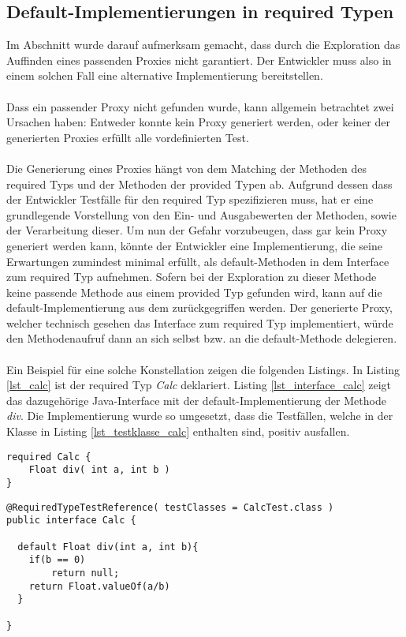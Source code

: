 \subsection{Default-Implementierungen in required Typen}
Im Abschnitt \label{sec_stability} wurde darauf aufmerksam gemacht, dass durch die Exploration das Auffinden eines passenden Proxies nicht garantiert. Der Entwickler muss also in einem solchen Fall eine alternative Implementierung bereitstellen.
\\\\
Dass ein passender Proxy nicht gefunden wurde, kann allgemein betrachtet zwei Ursachen haben: Entweder konnte kein Proxy generiert werden, oder keiner der generierten Proxies erfüllt alle vordefinierten Test. 
\\\\
Die Generierung eines Proxies hängt von dem Matching der Methoden des required Typs und der Methoden der provided Typen ab. Aufgrund dessen dass der Entwickler Testfälle für den required Typ spezifizieren muss, hat er eine grundlegende Vorstellung von den Ein- und Ausgabewerten der Methoden, sowie der Verarbeitung dieser. Um nun der Gefahr vorzubeugen, dass gar kein Proxy generiert werden kann, könnte der Entwickler eine Implementierung, die seine Erwartungen zumindest minimal erfüllt, als default-Methoden in dem Interface zum required Typ aufnehmen. Sofern bei der Exploration zu dieser Methode keine passende Methode aus einem provided Typ gefunden wird, kann auf die default-Implementierung aus dem zurückgegriffen werden. Der generierte Proxy, welcher technisch gesehen das Interface zum required Typ implementiert, würde den Methodenaufruf dann an sich selbst bzw. an die default-Methode delegieren.
\\\\
Ein Beispiel für eine solche Konstellation zeigen die folgenden Listings. In Listing \ref{lst_calc} ist der required Typ \emph{Calc} deklariert. Listing \ref{lst_interface_calc} zeigt das dazugehörige Java-Interface mit der default-Implementierung der Methode \emph{div}. Die Implementierung wurde so umgesetzt, dass die Testfällen, welche in der Klasse in Listing \ref{lst_testklasse_calc} enthalten sind, positiv ausfallen.
\begin{lstlisting}[caption={Required Typ \emph{Calc}},captionpos=b, style = dsl, label=lst_calc]
required Calc {
	Float div( int a, int b )	
}
\end{lstlisting}
\begin{lstlisting}[style = java, caption = Interface Calc, captionpos = b, label = lst_interface_calc]
@RequiredTypeTestReference( testClasses = CalcTest.class )
public interface Calc {

  default Float div(int a, int b){
  	if(b == 0)
  		return null;
  	return Float.valueOf(a/b)
  }

}
\end{lstlisting}
